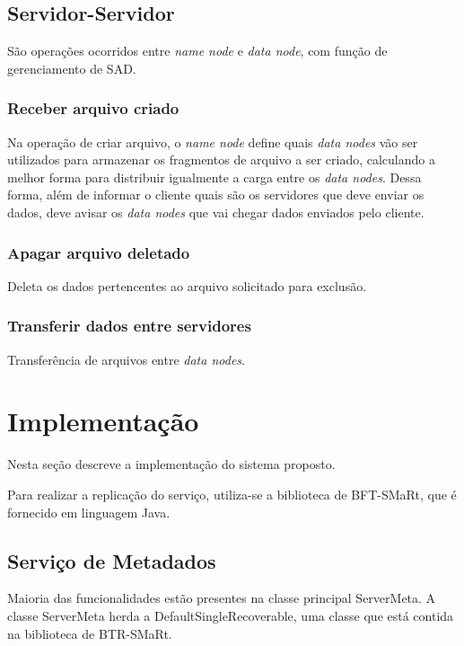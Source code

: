 	

	
	
	
	\subsection{Servidor-Servidor}
	São operações ocorridos entre \textit{name node} e \textit{data node}, com função de gerenciamento de SAD.
	
	\subsubsection{Receber arquivo criado}
	
	Na operação de criar arquivo, o \textit{name node} define quais \textit{data nodes} vão ser utilizados para armazenar os fragmentos de arquivo a ser criado, calculando a melhor forma para distribuir igualmente a carga entre os \textit{data nodes}. Dessa forma, além de informar o cliente quais são os servidores que deve enviar os dados, deve avisar os \textit{data nodes} que vai chegar dados enviados pelo cliente.
	
	\subsubsection{Apagar arquivo deletado}
	
	Deleta os dados pertencentes ao arquivo solicitado para exclusão.
	
	\subsubsection{Transferir dados entre servidores}
	
	Transferência de arquivos entre \textit{data nodes}.
	
	
	\section{Implementação}
	
	Nesta seção descreve a implementação do sistema proposto.
	
	Para realizar a replicação do serviço, utiliza-se a biblioteca de BFT-SMaRt, que é fornecido em linguagem Java.
	
	
	\subsection{Serviço de Metadados}
	Maioria das funcionalidades estão presentes na classe principal ServerMeta.
	A classe ServerMeta herda a DefaultSingleRecoverable, uma classe que está contida na biblioteca de BTR-SMaRt.
	
